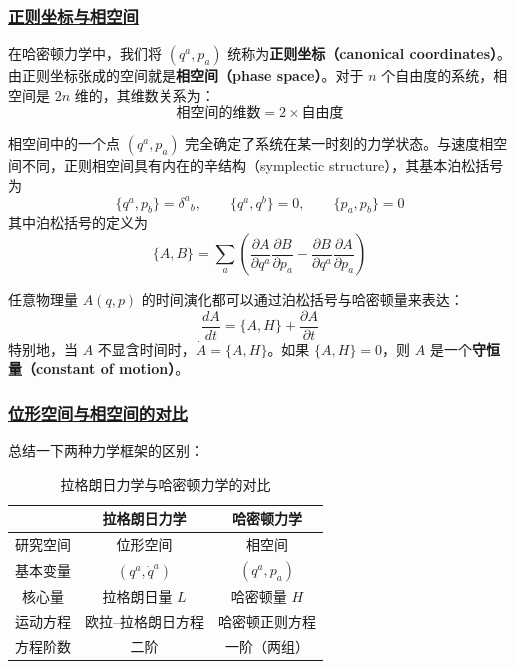 \subsubsection{\protect\hyperlink{:}{正则坐标与相空间}}

在哈密顿力学中，我们将 $(q^a, p_a)$ 统称为\textbf{正则坐标（canonical coordinates）}。由正则坐标张成的空间就是\textbf{相空间（phase space）}。对于 $n$ 个自由度的系统，相空间是 $2n$ 维的，其维数关系为：
\begin{equation}
    \text{相空间的维数} = 2 \times \text{自由度}
\end{equation}

相空间中的一个点 $(q^a, p_a)$ 完全确定了系统在某一时刻的力学状态。与速度相空间不同，正则相空间具有内在的辛结构（symplectic structure），其基本泊松括号为
\begin{equation}
    \{q^a, p_b\} = \delta^a{}_b, \qquad \{q^a, q^b\} = 0, \qquad \{p_a, p_b\} = 0
\end{equation}
其中泊松括号的定义为
\begin{equation}
    \{A, B\} = \sum_a \left(\frac{\partial A}{\partial q^a}\frac{\partial B}{\partial p_a} - \frac{\partial B}{\partial q^a}\frac{\partial A}{\partial p_a}\right)
\end{equation}

任意物理量 $A(q,p)$ 的时间演化都可以通过泊松括号与哈密顿量来表达：
\begin{equation}
    \frac{dA}{dt} = \{A, H\} + \frac{\partial A}{\partial t}
\end{equation}
特别地，当 $A$ 不显含时间时，$\dot{A} = \{A, H\}$。如果 $\{A, H\} = 0$，则 $A$ 是一个\textbf{守恒量（constant of motion）}。

\subsubsection{\protect\hyperlink{:}{位形空间与相空间的对比}}

总结一下两种力学框架的区别：

\begin{table}[hbpt]
    \centering
    \begin{tabular}{c|c|c}
        & 拉格朗日力学 & 哈密顿力学 \\
        \hline
        研究空间 & 位形空间 & 相空间 \\
        基本变量 & $(q^a, \dot{q}^a)$ & $(q^a, p_a)$ \\
        核心量 & 拉格朗日量 $L$ & 哈密顿量 $H$ \\
        运动方程 & 欧拉--拉格朗日方程 & 哈密顿正则方程 \\
        方程阶数 & 二阶 & 一阶（两组）
    \end{tabular}
    \caption{拉格朗日力学与哈密顿力学的对比}
\end{table}

